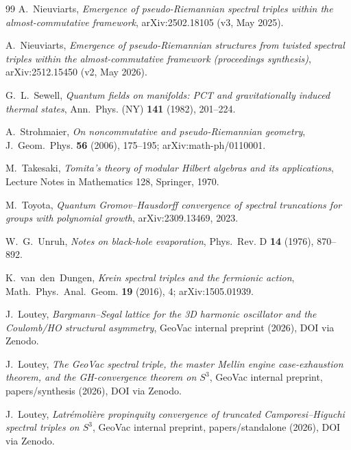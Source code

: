 \documentclass[11pt,a4paper]{article}
\theoremstyle{plain}
\theoremstyle{definition}
\newcommand{\sthree}{S^{3}}
\begin{document}
\begin{thebibliography}{99}
A.~Nieuviarts,
\newblock \emph{Emergence of pseudo-Riemannian spectral triples
within the almost-commutative framework},
\newblock arXiv:2502.18105 (v3, May 2025).

A.~Nieuviarts,
\newblock \emph{Emergence of pseudo-Riemannian structures from
twisted spectral triples within the almost-commutative framework
(proceedings synthesis)},
\newblock arXiv:2512.15450 (v2, May 2026).

G.~L.~Sewell,
\newblock \emph{Quantum fields on manifolds: PCT and gravitationally
induced thermal states},
\newblock Ann.~Phys. (NY) \textbf{141} (1982), 201--224.

A.~Strohmaier,
\newblock \emph{On noncommutative and pseudo-Riemannian geometry},
\newblock J.~Geom.~Phys. \textbf{56} (2006), 175--195;
\newblock arXiv:math-ph/0110001.

M.~Takesaki,
\newblock \emph{Tomita's theory of modular Hilbert algebras and its
applications},
\newblock Lecture Notes in Mathematics 128, Springer, 1970.

M.~Toyota,
\newblock \emph{Quantum Gromov--Hausdorff convergence of spectral
truncations for groups with polynomial growth},
\newblock arXiv:2309.13469, 2023.

W.~G.~Unruh,
\newblock \emph{Notes on black-hole evaporation},
\newblock Phys.~Rev. D \textbf{14} (1976), 870--892.

K.~van~den~Dungen,
\newblock \emph{Krein spectral triples and the fermionic action},
\newblock Math.~Phys.~Anal.~Geom. \textbf{19} (2016), 4;
\newblock arXiv:1505.01939.

J.~Loutey,
\newblock \emph{Bargmann--Segal lattice for the 3D harmonic oscillator
and the Coulomb/HO structural asymmetry},
\newblock GeoVac internal preprint (2026), DOI via Zenodo.

J.~Loutey,
\newblock \emph{The GeoVac spectral triple, the master Mellin engine
case-exhaustion theorem, and the GH-convergence theorem on $\sthree$},
\newblock GeoVac internal preprint, papers/synthesis (2026),
DOI via Zenodo.

J.~Loutey,
\newblock \emph{Latr\'emoli\`ere propinquity convergence of
truncated Camporesi--Higuchi spectral triples on $\sthree$},
\newblock GeoVac internal preprint, papers/standalone (2026),
DOI via Zenodo.


\end{thebibliography}
\end{document}
